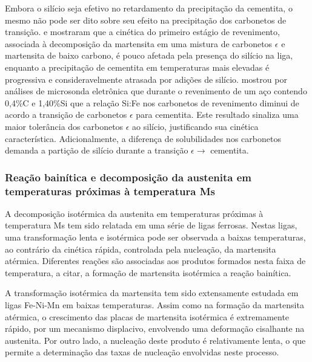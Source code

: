 Embora o silício seja efetivo no retardamento da precipitação da cementita, o mesmo não pode ser dito sobre seu efeito na precipitação dos carbonetos de transição.  e  mostraram que a cinética do primeiro estágio de revenimento, associada à decomposição da martensita em uma mistura de carbonetos $\epsilon$ e martensita de baixo carbono, é pouco afetada pela presença do silício na liga, enquanto a precipitação de cementita em temperaturas mais elevadas é progressiva e consideravelmente atrasada por adições de silício.  mostrou por análises de microsonda eletrônica que durante o revenimento de um aço contendo 0,4\%C e 1,40\%Si que a relação Si:Fe nos carbonetos de revenimento diminui de acordo a transição de carbonetos $\epsilon$ para cementita. Este resultado sinaliza uma maior tolerância dos carbonetos $\epsilon$ ao silício, justificando sua cinética característica. Adicionalmente, a diferença de solubilidades nos carbonetos demanda a partição de silício durante a transição $\epsilon \rightarrow$ cementita.



\subsubsection{Rea\c{c}\~{a}o bainítica e decomposi\c{c}\~{a}o da austenita em temperaturas pr\'{o}ximas \`{a} temperatura Ms}

\label{subsec:decompMs}

A decomposição isotérmica da austenita em temperaturas próximas à temperatura Ms tem sido relatada em uma série de ligas ferrosas. Nestas ligas, uma transformação lenta e isotérmica pode ser observada a baixas temperaturas, ao contrário da cinética rápida, controlada pela nucleação, da martensita atérmica. Diferentes reações são associadas aos produtos formados nesta faixa de temperatura, a citar, a formação de martensita isotérmica a reação bainítica.

A transformação isotérmica da martensita tem sido extensamente estudada em ligas Fe-Ni-Mn em baixas temperaturas\cite{Kaufman1958,Pati1969}. Assim como na formação da martensita atérmica, o crescimento das placas de martensita isotérmica é extremamente rápido, por um mecanismo displacivo, envolvendo uma deformação cisalhante na austenita. Por outro lado, a nucleação deste produto é relativamente lenta, o que permite a determinação das taxas de nucleação envolvidas neste processo\cite{Pati1969}. 

